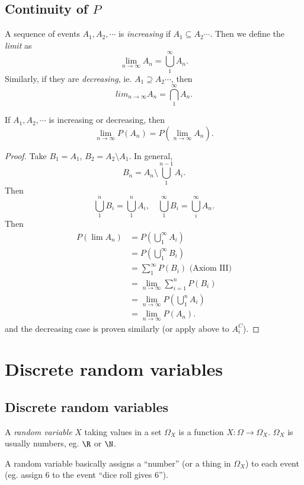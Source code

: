 \documentclass[a4paper]{article}
\begin{document}
\subsection{Continuity of $P$}
\begin{defi}
  A sequence of events $A_1, A_2, \cdots$ is \emph{increasing} if $A_1 \subseteq A_2 \cdots$. Then we define the \emph{limit} as
  \[
    \lim_{n\to \infty} A_n = \bigcup_{1}^\infty A_n.
  \]
  Similarly, if they are \emph{decreasing}, ie. $A_1\supseteq A_2\cdots$, then
  \[
    lim_{n\to \infty} A_n = \bigcap_{1}^\infty A_n.
  \]
\end{defi}

\begin{thm}
  If $A_1, A_2, \cdots$ is increasing or decreasing, then
  \[
    \lim_{n\to \infty} P(A_n) = P\left(\lim_{n\to \infty} A_n\right).
  \]
\end{thm}

\begin{proof}
  Take $B_1 = A_1$, $B_2 = A_2\setminus A_1$. In general,
  \[
    B_n = A_n\setminus\bigcup_1^{n - 1}A_i.
  \]
  Then
  \[
    \bigcup_1^n B_i = \bigcup_1^n A_i,\quad \bigcup_1^\infty B_i = \bigcup _i^\infty A_n.
  \]
  Then
  \begin{align*}
    P(\lim A_n) &= P\left(\bigcup_1^\infty A_i\right)\\
  &= P\left(\bigcup_1^\infty B_i\right)\\
  &=\sum_1^\infty P(B_i)\text{ (Axiom III)}\\
  &= \lim_{n \to \infty}\sum_{i = 1}^n P(B_i)\\
  &= \lim_{n \to \infty} P\left(\bigcup_1^n A_i\right)\\
  &= \lim_{n \to \infty} P(A_n).
  \end{align*}
  and the decreasing case is proven similarly (or apply above to $A_i^C$).
\end{proof}
\section{Discrete random variables}
\subsection{Discrete random variables}
\begin{defi}
  A \emph{random variable} $X$ taking values in a set $\Omega_X$ is a function $X: \Omega \to \Omega_X$. $\Omega_X$ is usually numbers, eg. $\R$ or $\N$.

  A random variable basically assigns a ``number'' (or a thing in $\Omega_X$) to each event (eg. assign $6$ to the event ``dice roll gives 6'').
\end{defi}
\end{document}
